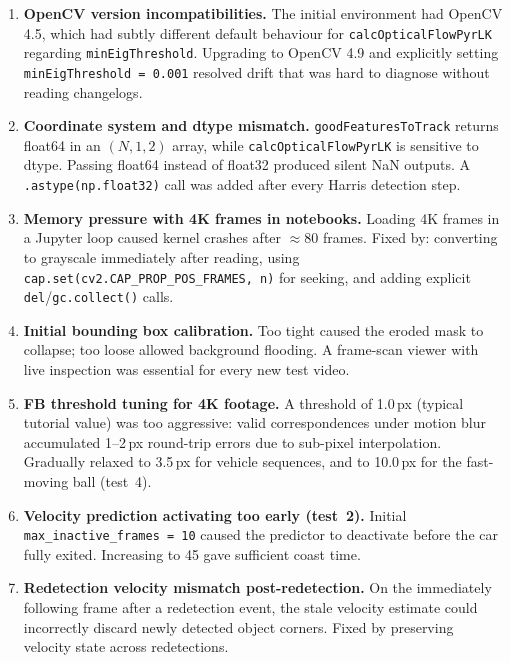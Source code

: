 \documentclass[12pt,a4paper]{article}
\begin{document}
\begin{enumerate}[leftmargin=1.8em]
  \item \textbf{OpenCV version incompatibilities.} The initial environment had OpenCV 4.5, which
    had subtly different default behaviour for \texttt{calcOpticalFlowPyrLK} regarding
    \texttt{minEigThreshold}. Upgrading to OpenCV 4.9 and explicitly setting
    \texttt{minEigThreshold\,=\,0.001} resolved drift that was hard to diagnose without reading
    changelogs.

  \item \textbf{Coordinate system and dtype mismatch.} \texttt{goodFeaturesToTrack} returns
    float64 in an $(N,1,2)$ array, while \texttt{calcOpticalFlowPyrLK} is sensitive to dtype.
    Passing float64 instead of float32 produced silent NaN outputs. A \texttt{.astype(np.float32)}
    call was added after every Harris detection step.

  \item \textbf{Memory pressure with 4K frames in notebooks.} Loading 4K frames in a Jupyter
    loop caused kernel crashes after $\approx$80 frames. Fixed by: converting to grayscale
    immediately after reading, using \texttt{cap.set(cv2.CAP\_PROP\_POS\_FRAMES, n)} for
    seeking, and adding explicit \texttt{del}/\texttt{gc.collect()} calls.

  \item \textbf{Initial bounding box calibration.} Too tight caused the eroded mask to collapse;
    too loose allowed background flooding. A frame-scan viewer with live inspection was
    essential for every new test video.

  \item \textbf{FB threshold tuning for 4K footage.} A threshold of 1.0\,px (typical tutorial
    value) was too aggressive: valid correspondences under motion blur accumulated 1--2\,px
    round-trip errors due to sub-pixel interpolation. Gradually relaxed to 3.5\,px for vehicle
    sequences, and to 10.0\,px for the fast-moving ball (test~4).

  \item \textbf{Velocity prediction activating too early (test~2).} Initial
    \texttt{max\_inactive\_frames\,=\,10} caused the predictor to deactivate before the car
    fully exited. Increasing to 45 gave sufficient coast time.

  \item \textbf{Redetection velocity mismatch post-redetection.} On the immediately following
    frame after a redetection event, the stale velocity estimate could incorrectly discard
    newly detected object corners. Fixed by preserving velocity state across redetections.


\end{enumerate}
\end{document}
